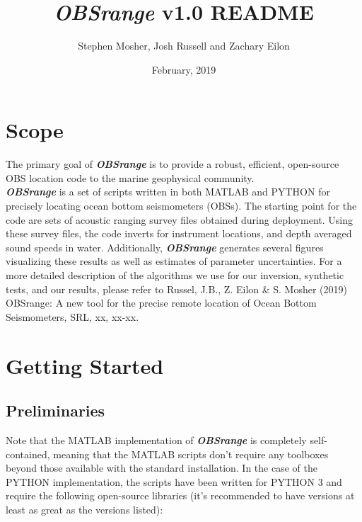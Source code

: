 \documentclass[titlepage, 12pt]{article}
\begin{document}
 \title{\textbf{\textit{\textit{\textbf{OBSrange}}}} v1.0 README}
 \author{Stephen Mosher, Josh Russell and Zachary Eilon}
 \date{February, 2019}
 \maketitle{}

 \tableofcontents
 \newpage

 \section{Scope}
   The primary goal of \textit{\textbf{OBSrange}} is to provide a robust, efficient, open-source OBS location code to the marine geophysical community.\\ 

   \textit{\textbf{OBSrange}} is a set of scripts written in both MATLAB and PYTHON for precisely locating ocean bottom seismometers (OBSs). The starting point for the code are sets of acoustic ranging survey files obtained during deployment. Using these survey files, the code inverts for instrument locations, and depth averaged sound speeds in water. Additionally, \textit{\textbf{OBSrange}} generates several figures visualizing these results as well as estimates of parameter uncertainties. For a more detailed description of the algorithms we use for our inversion, synthetic tests, and our results, please refer to Russel, J.B., Z. Eilon \& S. Mosher (2019) OBSrange: A new tool for the precise remote location of Ocean Bottom Seismometers, SRL, xx, xx-xx.

 \section{Getting Started}
  
  \subsection{Preliminaries}
  Note that the MATLAB implementation of \textit{\textbf{OBSrange}} is completely self-contained, meaning that the MATLAB scripts don’t require any toolboxes beyond those available with the standard installation. In the case of the PYTHON implementation, the scripts have been written for PYTHON 3 and require the following open-source libraries (it’s recommended to have versions at least as great as the versions listed):
\end{document}
